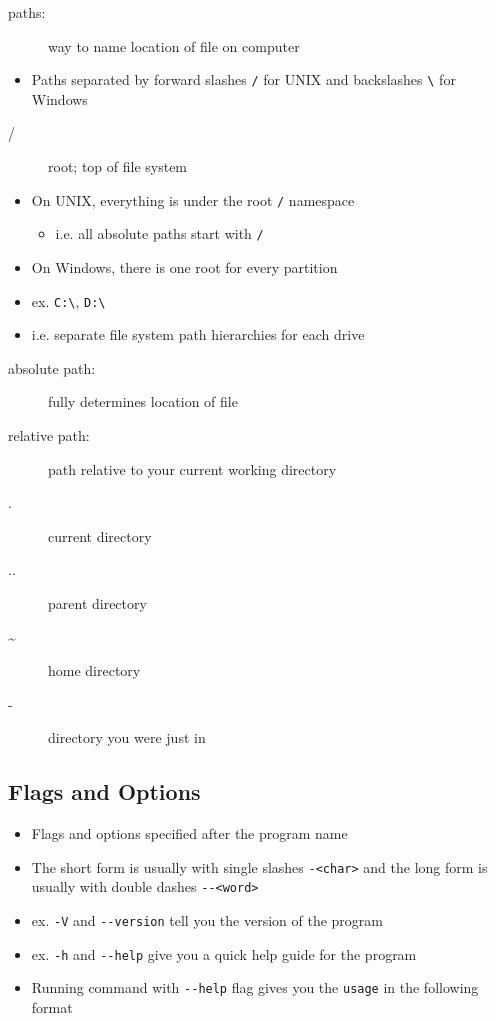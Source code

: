 \documentclass[letterpaper,12pt]{article}
\begin{document}
\begin{description}
 \item[paths:] way to name location of file on computer
\end{description}

\begin{itemize}
 \item Paths separated by forward slashes \lstinline{/} for UNIX and backslashes \lstinline{\} for Windows
\end{itemize}

\begin{description}
 \item[/] root; top of file system
\end{description}

\begin{itemize}
 \item On UNIX, everything is under the root \lstinline{/} namespace
       \begin{itemize}
        \item i.e. all absolute paths start with \lstinline{/}
       \end{itemize}
 \item On Windows, there is one root for every partition
 \item ex. \lstinline{C:\}, \lstinline{D:\}
 \item i.e. separate file system path hierarchies for each drive
\end{itemize}

\begin{description}
 \item[absolute path:] fully determines location of file
 \item[relative path:] path relative to your current working directory
 \item[.] current directory
 \item[..] parent directory
 \item[\textasciitilde] home directory
 \item[-] directory you were just in
\end{description}

\subsection{Flags and Options}

\begin{itemize}
 \item Flags and options specified after the program name
 \item The short form is usually with single slashes \lstinline{-<char>} and the long form is usually with double dashes \lstinline{--<word>}
 \item ex. \lstinline{-V} and \lstinline{--version} tell you the version of the program
 \item ex. \lstinline{-h} and \lstinline{--help} give you a quick help guide for the program
 \item Running command with \lstinline{--help} flag gives you the \lstinline{usage} in the following format
\end{itemize}
\end{document}
